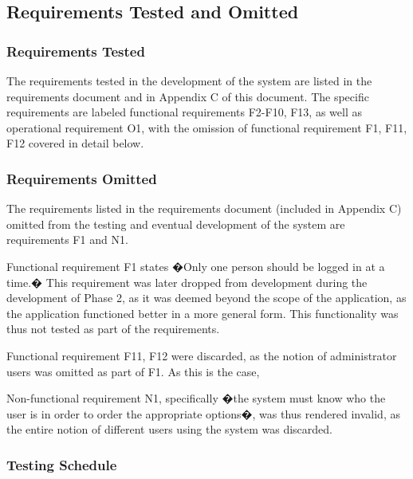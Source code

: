 \documentclass[12pt]{article}
\begin{document}
\subsection{Requirements Tested and Omitted}
\subsubsection{Requirements Tested} \label{rt:1}
       
{
The requirements tested in the development of the system are listed in the requirements document and in Appendix C of this document. The specific requirements are labeled functional requirements F2-F10, F13, as well as operational requirement O1, with the omission of functional requirement F1, F11, F12 covered in detail below.
}

\subsubsection{Requirements Omitted} \label{rt:2}

{
The requirements listed in the requirements document (included in Appendix C) omitted from the testing and eventual development of the system are requirements F1 and N1.

Functional requirement F1 states �Only one person should be logged in at a time.� This requirement was later dropped from development during the development of Phase 2, as it was deemed beyond the scope of the application, as the application functioned better in a more general form. This functionality was thus not tested as part of the requirements.

Functional requirement F11, F12 were discarded, as the notion of administrator users was omitted as part of F1. As this is the case,

Non-functional requirement N1, specifically �the system must know who the user is in order to order the appropriate options�, was thus rendered invalid, as the entire notion of different users using the system was discarded.
}

\subsubsection{Testing Schedule}
\end{document}
